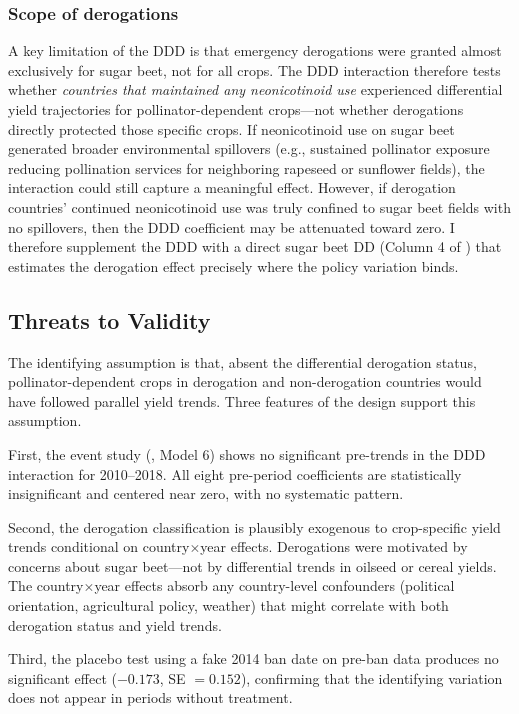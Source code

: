 \documentclass[12pt]{article}
\begin{document}
\subsubsection*{Scope of derogations} A key limitation of the DDD is that emergency derogations were granted almost exclusively for sugar beet, not for all crops. The DDD interaction therefore tests whether \textit{countries that maintained any neonicotinoid use} experienced differential yield trajectories for pollinator-dependent crops---not whether derogations directly protected those specific crops. If neonicotinoid use on sugar beet generated broader environmental spillovers (e.g., sustained pollinator exposure reducing pollination services for neighboring rapeseed or sunflower fields), the interaction could still capture a meaningful effect. However, if derogation countries' continued neonicotinoid use was truly confined to sugar beet fields with no spillovers, then the DDD coefficient may be attenuated toward zero. I therefore supplement the DDD with a direct sugar beet DD (Column 4 of ) that estimates the derogation effect precisely where the policy variation binds.

\subsection{Threats to Validity}

The identifying assumption is that, absent the differential derogation status, pollinator-dependent crops in derogation and non-derogation countries would have followed parallel yield trends. Three features of the design support this assumption.

First, the event study (, Model 6) shows no significant pre-trends in the DDD interaction for 2010--2018. All eight pre-period coefficients are statistically insignificant and centered near zero, with no systematic pattern.

Second, the derogation classification is plausibly exogenous to crop-specific yield trends conditional on country$\times$year effects. Derogations were motivated by concerns about sugar beet---not by differential trends in oilseed or cereal yields. The country$\times$year effects absorb any country-level confounders (political orientation, agricultural policy, weather) that might correlate with both derogation status and yield trends.

Third, the placebo test using a fake 2014 ban date on pre-ban data produces no significant effect ($-0.173$, SE $= 0.152$), confirming that the identifying variation does not appear in periods without treatment.
\end{document}
